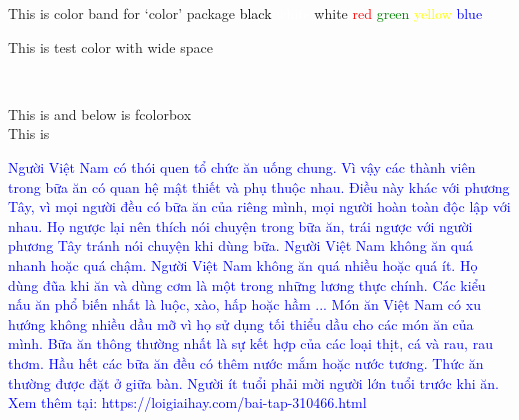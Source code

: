 \documentclass[12pt, a4paper]{report}
\begin{document}
\newpage

This is color band for `color' package
\textcolor{black}{black} 
\textcolor{white}{white} white
\textcolor{red}{red} 
\textcolor{green}{green} 
\textcolor{yellow}{yellow}
\textcolor{blue}{blue}

This is test color with wide space

\color{red}
\lipsum[1]\\
\color{black}


This is \colorbox{green}{\lipsum[1]} and below is fcolorbox\\
This is \\


\newpage

\selectfont

\textcolor{blue}
{
Người Việt Nam có thói quen tổ chức ăn uống chung.
Vì vậy các thành viên trong bữa ăn có quan hệ mật thiết và phụ thuộc nhau.
Điều này khác với phương Tây, vì mọi người đều có bữa ăn của riêng mình,
mọi người hoàn toàn độc lập với nhau. Họ ngược lại nên thích nói chuyện trong bữa ăn, 
trái ngược với người phương Tây tránh nói chuyện khi dùng bữa. 
Người Việt Nam không ăn quá nhanh hoặc quá chậm. Người Việt Nam không ăn quá nhiều hoặc quá ít.
Họ dùng đũa khi ăn và dùng cơm là một trong những lương thực chính. 
Các kiểu nấu ăn phổ biến nhất là luộc, xào, hấp hoặc hầm ...
Món ăn Việt Nam có xu hướng không nhiều dầu mỡ vì họ sử dụng tối thiểu dầu cho các món ăn của mình. 
Bữa ăn thông thường nhất là sự kết hợp của các loại thịt, cá và rau, rau thơm. 
Hầu hết các bữa ăn đều có thêm nước mắm hoặc nước tương.
Thức ăn thường được đặt ở giữa bàn. Người ít tuổi phải mời người lớn tuổi trước khi ăn.
Xem thêm tại: https://loigiaihay.com/bai-tap-310466.html
}

\end{document}
